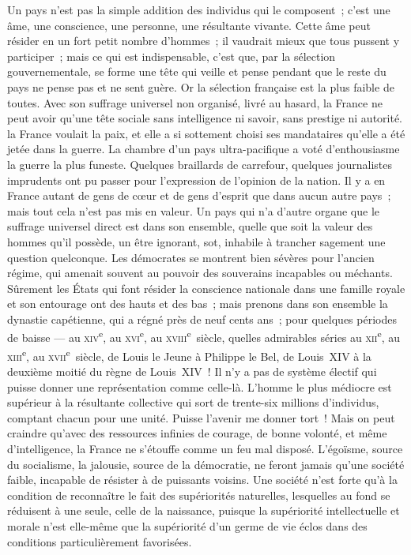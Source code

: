 \documentclass[french,twoside]{book} %
\begin{document}
Un pays n’est pas la simple addition des individus qui le composent ; c’est une âme, une conscience, une personne, une résultante vivante. Cette âme peut résider en un fort petit nombre d’hommes ; il vaudrait mieux que tous pussent y participer ; mais ce qui est indispensable, c’est que, par la sélection gouvernementale, se forme une tête qui veille et pense pendant que le reste du pays ne pense pas et ne sent guère. Or la sélection française est la plus faible de toutes. Avec son suffrage universel non organisé, livré au hasard, la France ne peut avoir qu’une tête sociale sans intelligence ni savoir, sans prestige ni autorité. la France voulait la paix, et elle a si sottement choisi ses mandataires qu’elle a été jetée dans la guerre. La chambre d’un pays ultra-pacifique a voté d’enthousiasme la guerre la plus funeste. Quelques braillards de carrefour, quelques journalistes imprudents ont pu passer pour l’expression de l’opinion de la nation. Il y a en France autant de gens de cœur et de gens d’esprit que dans aucun autre pays ; mais tout cela n’est pas mis en valeur. Un pays qui n’a d’autre organe que le suffrage universel direct est dans son ensemble, quelle que soit la valeur des hommes qu’il possède, un être ignorant, sot, inhabile à trancher sagement une question quelconque. Les démocrates se montrent bien sévères pour l’ancien régime, qui amenait souvent au pouvoir des souverains incapables ou méchants. Sûrement les États qui font résider la conscience nationale dans une famille royale et son entourage ont des hauts et des bas ; mais prenons dans son ensemble la dynastie capétienne, qui a régné près de neuf cents ans ; pour quelques périodes de baisse — au \textsc{xiv}\textsuperscript{e}, au \textsc{xvi}\textsuperscript{e}, au \textsc{xviii}\textsuperscript{e} siècle, quelles admirables séries au \textsc{xii}\textsuperscript{e}, au \textsc{xiii}\textsuperscript{e}, au \textsc{xvii}\textsuperscript{e} siècle, de Louis le Jeune à Philippe le Bel, de Louis XIV à la deuxième moitié du règne de Louis XIV ! Il n’y a pas de système électif qui puisse donner une représentation comme celle-là. L’homme le plus médiocre est supérieur à la résultante collective qui sort de trente-six millions d’individus, comptant chacun pour une unité. Puisse l’avenir me donner tort ! Mais on peut craindre qu’avec des ressources infinies de courage, de bonne volonté, et même d’intelligence, la France ne s’étouffe comme un feu mal disposé. L’égoïsme, source du socialisme, la jalousie, source de la démocratie, ne feront jamais qu’une société faible, incapable de résister à de puissants voisins. Une société n’est forte qu’à la condition de reconnaître le fait des supériorités naturelles, lesquelles au fond se réduisent à une seule, celle de la naissance, puisque la supériorité intellectuelle et morale n’est elle-même que la supériorité d’un germe de vie éclos dans des conditions particulièrement favorisées.
\end{document}
